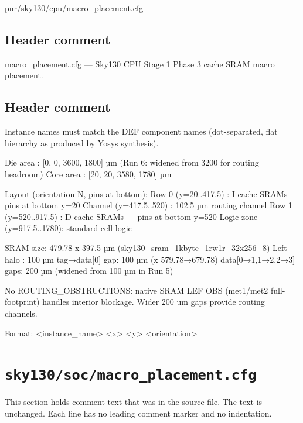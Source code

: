 \begin{relocated}{pnr/sky130/cpu/macro_placement.cfg}

\subsection*{Header comment}

\begin{textblock}
macro_placement.cfg — Sky130 CPU Stage 1
Phase 3 cache SRAM macro placement.
\end{textblock}

\subsection*{Header comment}

\begin{textblock}
Instance names must match the DEF component names (dot-separated,
flat hierarchy as produced by Yosys synthesis).

Die area  : [0, 0, 3600, 1800] µm  (Run 6: widened from 3200 for routing headroom)
Core area : [20, 20, 3580, 1780] µm

Layout (orientation N, pins at bottom):
  Row 0 (y=20..417.5)   : I-cache SRAMs — pins at bottom y=20
  Channel (y=417.5..520) : 102.5 µm routing channel
  Row 1 (y=520..917.5)  : D-cache SRAMs — pins at bottom y=520
  Logic zone (y=917.5..1780): standard-cell logic

SRAM size: 479.78 x 397.5 µm  (sky130_sram_1kbyte_1rw1r_32x256_8)
Left halo : 100 µm
tag→data[0] gap: 100 µm (x 579.78→679.78)
data[0→1,1→2,2→3] gaps: 200 µm  (widened from 100 µm in Run 5)

No ROUTING_OBSTRUCTIONS: native SRAM LEF OBS (met1/met2 full-footprint)
handles interior blockage. Wider 200 um gaps provide routing channels.

Format: <instance_name> <x> <y> <orientation>
\end{textblock}

\end{relocated}

\section{\texttt{sky130/soc/macro\_placement.cfg}}\label{tm:pd:sky130-soc-macro-placement-cfg}

This section holds comment text that was in the source file. The text is unchanged. Each line has no leading comment marker and no indentation.

